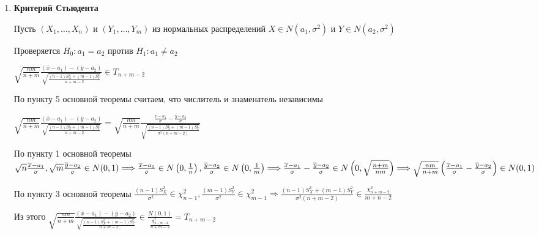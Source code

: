 \documentclass[12pt]{article}
\begin{document}
\begin{enumerate}[label*=\Roman*. ]
    \item \textbf{Критерий Стьюдента}

    Пусть $(X_1, \dots, X_n)$ и $(Y_1, \dots, Y_m)$ из нормальных распределений $X \in N(a_1, \sigma^2)$ и $Y \in N(a_2, \sigma^2)$

    Проверяется $H_0 : a_1 = a_2$ против $H_1 : a_1 \neq a_2$

    \begin{MyTheorem}
        \Ths $\sqrt{\frac{nm}{n + m}} \frac{(\overline x - a_1) - (\overline y - a_2)}{\sqrt{\frac{(n - 1) S_X^2 + (m - 1) S^2_Y}{n + m - 2}}} \in T_{n + m - 2}$
    \end{MyTheorem}

    \begin{MyProof}
        По пункту 5 основной теоремы считаем, что числитель и знаменатель независимы 

        $\sqrt{\frac{nm}{n + m}} \frac{(\overline x - a_1) - (\overline y - a_2)}{\sqrt{\frac{(n - 1) S_X^2 + (m - 1) S^2_Y}{n + m - 2}}} = 
        \sqrt{\frac{nm}{n + m}} \frac{\frac{\overline x - a_1}{\sigma} - \frac{\overline y - a_2}{\sigma}}{\sqrt{\frac{(n - 1) S_X^2 + (m - 1) S^2_Y}{\sigma^2 (n + m - 2)}}}$

        По пункту 1 основной теоремы $\sqrt{n} \frac{\overline x - a_1}{\sigma}, \sqrt{m} \frac{\overline y - a_2}{\sigma} \in N(0, 1) \Longrightarrow \\
        \frac{\overline x - a_1}{\sigma} \in N\left(0, \frac{1}{n}\right), \frac{\overline y - a_2}{\sigma} \in N\left(0, \frac{1}{m}\right) \Longrightarrow \\
        \frac{\overline x - a_1}{\sigma} - \frac{\overline y - a_2}{\sigma} \in N\left(0, \sqrt{\frac{n + m}{nm}}\right) \Longrightarrow \\
        \sqrt{\frac{nm}{n + m}} \left(\frac{\overline x - a_1}{\sigma} - \frac{\overline y - a_2}{\sigma}\right) \in N(0, 1)$

        По пункту 3 основной теоремы $\frac{(n - 1)S^2_X}{\sigma^2} \in \chi^2_{n - 1}, \frac{(m - 1)S^2_Y}{\sigma^2} \in \chi^2_{m - 1} \Longrightarrow
        \frac{(n - 1) S_X^2 + (m - 1) S^2_Y}{\sigma^2 (n + m - 2)} \in \frac{\chi^2_{n + m - 2}}{m + n - 2}$

        Из этого $\sqrt{\frac{nm}{n + m}} \frac{(\overline x - a_1) - (\overline y - a_2)}{\sqrt{\frac{(n - 1) S_X^2 + (m - 1) S^2_Y}{n + m - 2}}} \in \frac{N(0, 1)}{\frac{\chi^2_{n + m - 2}}{n + m - 2}} = T_{n + m - 2}$
    \end{MyProof}


\end{enumerate}
\end{document}
